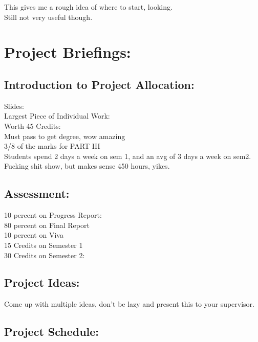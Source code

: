 \documentclass [12pt]{article}
\begin{document}
  This gives me a rough idea of where to start, looking. \\ 

  
  Still not very useful though. \\

\section{Project Briefings:}

\subsection{Introduction to Project Allocation:}

Slides:\\

Largest Piece of Individual Work:\\
Worth 45 Credits:\\
Must pass to get degree, wow amazing\\ 
3/8 of the marks for PART III\\
Students spend 2 days a week on sem 1, and an avg of 3 days a week on sem2.\\ 
Fucking shit show, but makes sense 450 hours, yikes.\\ 

\subsection{Assessment:}

10 percent on Progress  Report:\\
80 percent on Final Report\\
10 percent on Viva\\

15 Credits on Semester 1\\
30 Credits on Semester 2:\\

\subsection{Project Ideas:}

Come up with multiple ideas, don't be lazy and present this to your supervisor.\\ 


\subsection{Project Schedule:}
\end{document}
